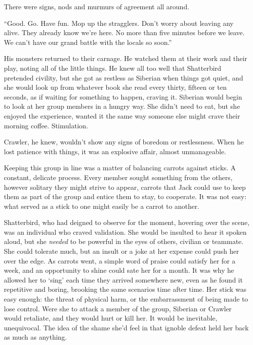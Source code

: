 There were signs, nods and murmurs of agreement all around.



``Good.  Go.  Have fun.  Mop up the stragglers.  Don't worry about leaving any alive.  They already know we're here.  No more than five minutes before we leave.  We can't have our grand battle with the locals so soon.''



His monsters returned to their carnage.  He watched them at their work and their play, noting all of the little things.  He knew all too well that Shatterbird pretended civility, but she got as restless as Siberian when things got quiet, and she would look up from whatever book she read every thirty, fifteen or ten seconds, as if waiting for something to happen, craving it.  Siberian would begin to look at her group members in a hungry way.  She didn't need to eat, but she enjoyed the experience, wanted it the same way someone else might crave their morning coffee.  Stimulation.



Crawler, he knew, wouldn't show any signs of boredom or restlessness.  When he lost patience with things, it was an explosive affair, almost unmanageable.



Keeping this group in line was a matter of balancing carrots against sticks.  A constant, delicate process.  Every member sought something from the others, however solitary they might strive to appear, carrots that Jack could use to keep them as part of the group and entice them to stay, to cooperate.  It was not easy: what served as a stick to one might easily be a carrot to another.



Shatterbird, who had deigned to observe for the moment, hovering over the scene, was an individual who craved validation.  She would be insulted to hear it spoken aloud, but she \emph{needed} to be powerful in the eyes of others, civilian or teammate.  She could tolerate much, but an insult or a joke at her expense could push her over the edge.  As carrots went, a simple word of praise could satisfy her for a week, and an opportunity to shine could sate her for a month.  It was why he allowed her to `sing' each time they arrived somewhere new, even as he found it repetitive and boring, brooking the same scenarios time after time.  Her stick was easy enough: the threat of physical harm, or the embarrassment of being made to lose control.  Were she to attack a member of the group, Siberian or Crawler would retaliate, and they would hurt or kill her.  It would be inevitable, unequivocal.  The idea of the shame she'd feel in that ignoble defeat held her back as much as anything.



